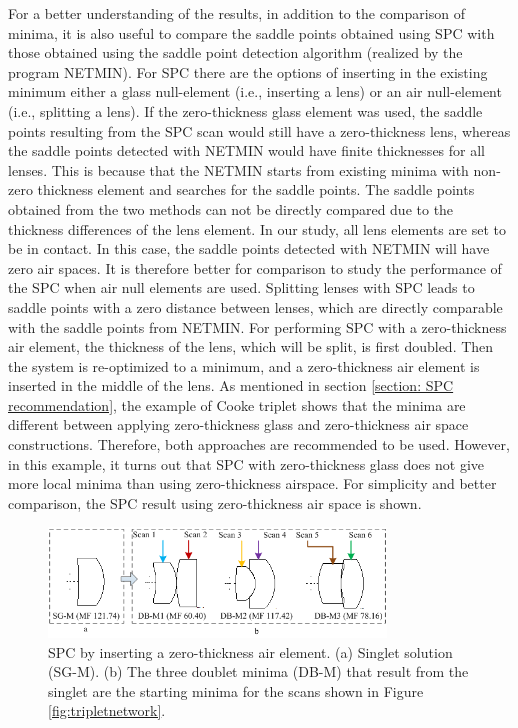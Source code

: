 For a better understanding of the results, in addition to the comparison of minima, it is also useful to compare the saddle points obtained using SPC with those obtained using the saddle point detection algorithm (realized by the program NETMIN). For SPC there are the options of inserting in the existing minimum either a glass null-element (i.e., inserting a lens) or an air null-element (i.e., splitting a lens). If the zero-thickness glass element was used, the saddle points resulting from the SPC scan would still have a zero-thickness lens, whereas the saddle points detected with NETMIN would have finite thicknesses for all lenses. This is because that the NETMIN starts from existing minima with non-zero thickness element and searches for the saddle points. The saddle points obtained from the two methods can not be directly compared due to the thickness differences of the lens element. In our study, all lens elements are set to be in contact. In this case, the saddle points detected with NETMIN will have zero air spaces. It is therefore better for comparison to study the performance of the SPC when air null elements are used. Splitting lenses with SPC leads to saddle points with a zero distance between lenses, which are directly comparable with the saddle points from NETMIN. For performing SPC with a zero-thickness air element, the thickness of the lens, which will be split, is first doubled. Then the system is re-optimized to a minimum, and a zero-thickness air element is inserted in the middle of the lens. As mentioned in section \ref{section: SPC recommendation}, the example of Cooke triplet shows that the minima are different between applying zero-thickness glass and zero-thickness air space constructions. Therefore, both approaches are recommended to be used. However, in this example, it turns out that SPC with zero-thickness glass does not give more local minima than using zero-thickness airspace. For simplicity and better comparison, the SPC result using zero-thickness air space is shown. 
\begin{figure}[h!]
    \centering
    \includegraphics[width=0.8\textwidth]{chapter-3/figures/Single2Double.png}
    \caption{SPC by inserting a zero-thickness air element. (a) Singlet solution (SG-M). (b) The three doublet minima (DB-M) that result from the singlet are the starting minima for the scans shown in Figure \ref{fig:tripletnetwork}.}
    \label{fig:single2double}
\end{figure}

